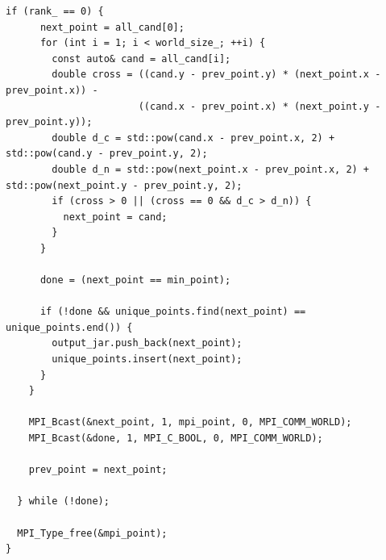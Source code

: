 \documentclass[12pt,a4paper]{article}
\begin{document}
\begin{lstlisting}[caption={Гибридная версия алгоритма(MPI+STL)}]
    if (rank_ == 0) {
      next_point = all_cand[0];
      for (int i = 1; i < world_size_; ++i) {
        const auto& cand = all_cand[i];
        double cross = ((cand.y - prev_point.y) * (next_point.x - prev_point.x)) -
                       ((cand.x - prev_point.x) * (next_point.y - prev_point.y));
        double d_c = std::pow(cand.x - prev_point.x, 2) + std::pow(cand.y - prev_point.y, 2);
        double d_n = std::pow(next_point.x - prev_point.x, 2) + std::pow(next_point.y - prev_point.y, 2);
        if (cross > 0 || (cross == 0 && d_c > d_n)) {
          next_point = cand;
        }
      }

      done = (next_point == min_point);

      if (!done && unique_points.find(next_point) == unique_points.end()) {
        output_jar.push_back(next_point);
        unique_points.insert(next_point);
      }
    }

    MPI_Bcast(&next_point, 1, mpi_point, 0, MPI_COMM_WORLD);
    MPI_Bcast(&done, 1, MPI_C_BOOL, 0, MPI_COMM_WORLD);

    prev_point = next_point;

  } while (!done);

  MPI_Type_free(&mpi_point);
}
\end{lstlisting}
\end{document}

